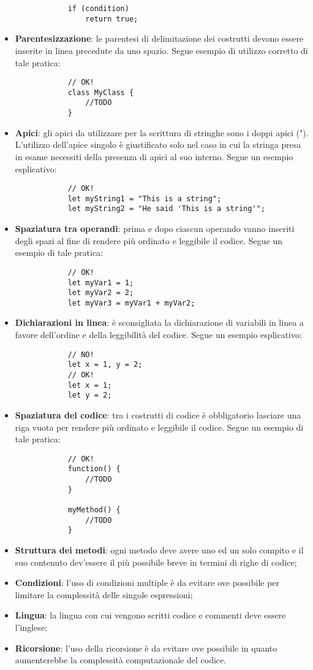 \begin{itemize}
\begin{verbatim}
			if (condition)
			    return true;
			\end{verbatim}
				\item \textbf{Parentesizzazione}: le parentesi di delimitazione dei costrutti devono essere inserite in linea precedute da uno spazio. Segue esempio di utilizzo corretto di tale pratica:
			\begin{verbatim}
			// OK!
			class MyClass {
			    //TODO
			}
			\end{verbatim}
				\item \textbf{Apici}: gli apici da utilizzare per la scrittura di stringhe sono i doppi apici ("). L'utilizzo dell'apice singolo è giustificato solo nel caso in cui la stringa presa in esame necessiti della presenza di apici al suo interno. Segue un esempio esplicativo:
			\begin{verbatim}
			// OK!
			let myString1 = "This is a string";
			let myString2 = "He said 'This is a string'";
			\end{verbatim}
				\item \textbf{Spaziatura tra operandi}: prima e dopo ciascun operando vanno inseriti degli spazi al fine di rendere più ordinato e leggibile il codice. Segue un esempio di tale pratica:
			\begin{verbatim}
			// OK!
			let myVar1 = 1;
			let myVar2 = 2;
			let myVar3 = myVar1 + myVar2;
			\end{verbatim}
				\item \textbf{Dichiarazioni in linea}: è sconsigliata la dichiarazione di variabili in linea a favore dell'ordine e della leggibilità del codice. Segue un esempio esplicativo:
			\begin{verbatim}
			// NO!
			let x = 1, y = 2;
			// OK!
			let x = 1;
			let y = 2;
			\end{verbatim}
				\item \textbf{Spaziatura del codice}: tra i costrutti di codice è obbligatorio lasciare una riga vuota per rendere più ordinato e leggibile il codice. Segue un esempio di tale pratica:
			\begin{verbatim}
			// OK!
			function() {
			    //TODO
			}
			
			myMethod() {
			    //TODO
			}
			\end{verbatim}
				\item \textbf{Struttura dei metodi}: ogni metodo deve avere uno ed un solo compito e il suo contenuto dev'essere il più possibile breve in termini di righe di codice;
				\item \textbf{Condizioni}: l'uso di condizioni multiple è da evitare ove possibile per limitare la complessità delle singole espressioni;
				\item \textbf{Lingua}: la lingua con cui vengono scritti codice e commenti deve essere l'inglese;
				\item \textbf{Ricorsione}: l'uso della ricorsione è da evitare ove possibile in quanto aumenterebbe la complessità computazionale del codice.
			\end{itemize}
